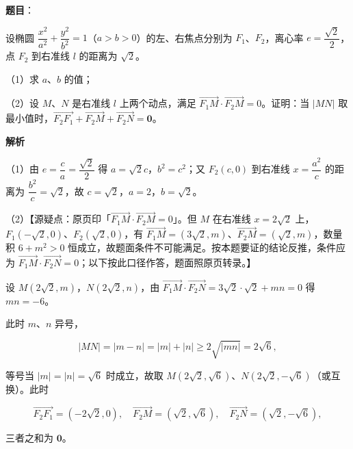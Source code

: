 \begin{answer}

\textbf{题目}：

设椭圆 $\dfrac{x^2}{a^2}+\dfrac{y^2}{b^2}=1$（$a>b>0$）的左、右焦点分别为 $F_1$、$F_2$，离心率 $e=\dfrac{\sqrt2}2$，点 $F_2$ 到右准线 $l$ 的距离为 $\sqrt2$。

（1）求 $a$、$b$ 的值；

（2）设 $M$、$N$ 是右准线 $l$ 上两个动点，满足 $\overrightarrow{F_1M}\cdot\overrightarrow{F_2M}=0$。证明：当 $|MN|$ 取最小值时，$\overrightarrow{F_2F_1}+\overrightarrow{F_2M}+\overrightarrow{F_2N}=\boldsymbol 0$。

\textbf{解析}

（1）由 $e=\dfrac ca=\dfrac{\sqrt2}2$ 得 $a=\sqrt2c$，$b^2=c^2$；又 $F_2(c,0)$ 到右准线 $x=\dfrac{a^2}c$ 的距离为 $\dfrac{b^2}c=\sqrt2$，故 $c=\sqrt2$，$a=2$，$b=\sqrt2$。

（2）【源疑点：原页印「$\overrightarrow{F_1M}\cdot\overrightarrow{F_2M}=0$」。但 $M$ 在右准线 $x=2\sqrt2$ 上，$F_1(-\sqrt2,0)$、$F_2(\sqrt2,0)$，有 $\overrightarrow{F_1M}=(3\sqrt2,m)$、$\overrightarrow{F_2M}=(\sqrt2,m)$，数量积 $6+m^2>0$ 恒成立，故题面条件不可能满足。按本题要证的结论反推，条件应为 $\overrightarrow{F_1M}\cdot\overrightarrow{F_2N}=0$；以下按此口径作答，题面照原页转录。】

设 $M(2\sqrt2,m)$，$N(2\sqrt2,n)$，由 $\overrightarrow{F_1M}\cdot\overrightarrow{F_2N}=3\sqrt2\cdot\sqrt2+mn=0$ 得 $mn=-6$。

此时 $m$、$n$ 异号，

\nopagebreak[4]
\[|MN|=|m-n|=|m|+|n|\geqslant2\sqrt{|mn|}=2\sqrt6,\]

等号当 $|m|=|n|=\sqrt6$ 时成立，故取 $M(2\sqrt2,\sqrt6)$、$N(2\sqrt2,-\sqrt6)$（或互换）。此时

\nopagebreak[4]
\[\overrightarrow{F_2F_1}=(-2\sqrt2,0),\quad \overrightarrow{F_2M}=(\sqrt2,\sqrt6),\quad \overrightarrow{F_2N}=(\sqrt2,-\sqrt6),\]

三者之和为 $\boldsymbol 0$。


\end{answer}